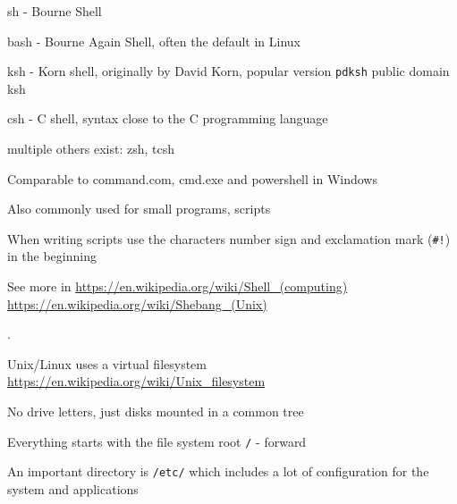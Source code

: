 \documentclass[Screen16to9,17pt]{foils}
\begin{document}


  \begin{list2}
    \item sh - Bourne Shell
\item bash - Bourne Again Shell, often the default in Linux
\item ksh - Korn shell, originally by David Korn, popular version \verb+pdksh+ public domain ksh
\item csh - C shell, syntax close to the C programming language
\item multiple others exist: zsh, tcsh
  \end{list2}
\begin{list1}
\item Comparable to command.com, cmd.exe and powershell in Windows
\item Also commonly used for small programs, scripts
\item When writing scripts use the characters number sign and exclamation mark (\verb+#!+) in the beginning
\end{list1}

See more in \url{https://en.wikipedia.org/wiki/Shell_(computing)}\\
\url{https://en.wikipedia.org/wiki/Shebang_(Unix)}


.
\begin{list2}

\item Unix/Linux uses a virtual filesystem\\
\url{https://en.wikipedia.org/wiki/Unix_filesystem}
\item No drive letters, just disks mounted in a common tree
\item Everything starts with the file system root \verb+/+ - forward
\item An important directory is \verb+/etc/+ which includes a lot of configuration for the system and applications
\end{list2}



\end{document}
